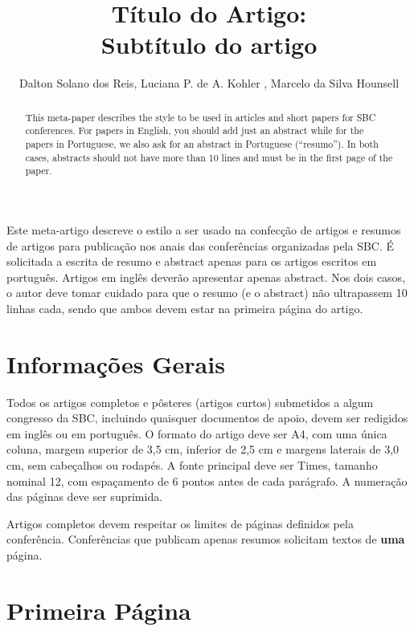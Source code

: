 \documentclass[12pt]{article}
\title{Título do Artigo:\\ Subtítulo do artigo}
\author{Dalton Solano dos Reis\inst{1}, Luciana P. de A. Kohler \inst{1}, Marcelo da Silva Hounsell\inst{2} }
\begin{document}
 

\maketitle

\begin{abstract}
  This meta-paper describes the style to be used in articles and short papers for SBC conferences. For papers in English, you should add just an abstract while for the papers in Portuguese, we also ask for an abstract in Portuguese (``resumo''). In both cases, abstracts should not have more than 10 lines and must be in the first page of the paper.
\end{abstract}
     
\begin{resumo} 
  Este meta-artigo descreve o estilo a ser usado na confecção de artigos e resumos de artigos para publicação nos anais das conferências organizadas pela SBC. É solicitada a escrita de resumo e abstract apenas para os artigos escritos em português. Artigos em inglês deverão apresentar apenas abstract. Nos dois casos, o autor deve tomar cuidado para que o resumo (e o abstract) não ultrapassem 10 linhas cada, sendo que ambos devem estar na primeira página do artigo.
\end{resumo}

\section{Informações Gerais}

Todos os artigos completos e pôsteres (artigos curtos) submetidos a algum congresso da SBC, incluindo quaisquer documentos de apoio, devem ser redigidos em inglês ou em português. O formato do artigo deve ser A4, com uma única coluna, margem superior de 3,5 cm, inferior de 2,5 cm e margens laterais de 3,0 cm, sem cabeçalhos ou rodapés. A fonte principal deve ser Times, tamanho nominal 12, com espaçamento de 6 pontos antes de cada parágrafo. A numeração das páginas deve ser suprimida.

Artigos completos devem respeitar os limites de páginas definidos pela conferência. Conferências que publicam apenas resumos solicitam textos de \textbf{uma} página.

\section{Primeira Página} \label{sec:firstpage}
\end{document}
